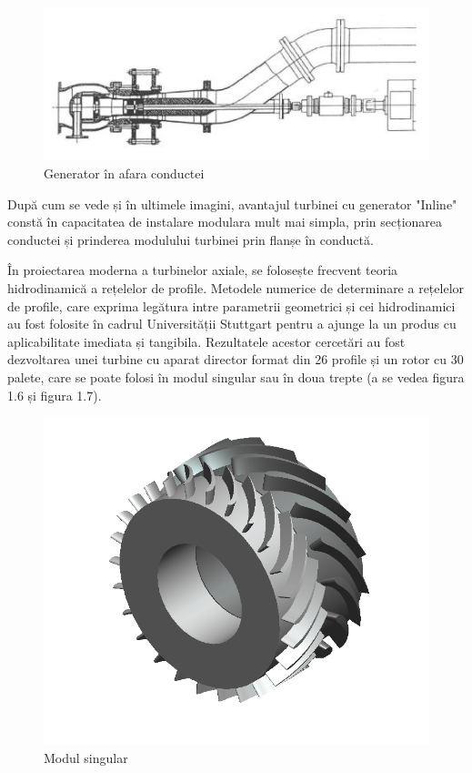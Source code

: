 \begin{figure}[h!]
	\centering
	\includegraphics[scale=1]{figures/generator_in_afara_conductei.jpg}
	\caption{Generator în afara conductei \protect\cite{GREES_2014}}
	\label{Generator în afara conductei}
\end{figure}

După cum se vede și în ultimele imagini, avantajul turbinei cu generator "Inline" constă în capacitatea de instalare modulara mult mai simpla, prin secționarea conductei și prinderea modulului turbinei prin flanșe în conductă.

În proiectarea moderna a turbinelor axiale, se folosește frecvent teoria hidrodinamică a rețelelor de profile. Metodele numerice de determinare a rețelelor de profile, care exprima legătura intre parametrii geometrici și cei hidrodinamici au fost folosite în cadrul Universității Stuttgart pentru a ajunge la un produs cu aplicabilitate imediata și tangibila. Rezultatele acestor cercetări au fost dezvoltarea unei turbine cu aparat director format din 26 profile și un rotor cu 30 palete, care se poate folosi în modul singular sau în doua trepte (a se vedea figura 1.6 și figura 1.7).

\begin{figure}[h!]
	\centering
	\includegraphics[scale=0.6]{figures/modul_singular.png}
	\caption{Modul singular \protect\cite{susanhub}}
	\label{Modul singular}
\end{figure}


